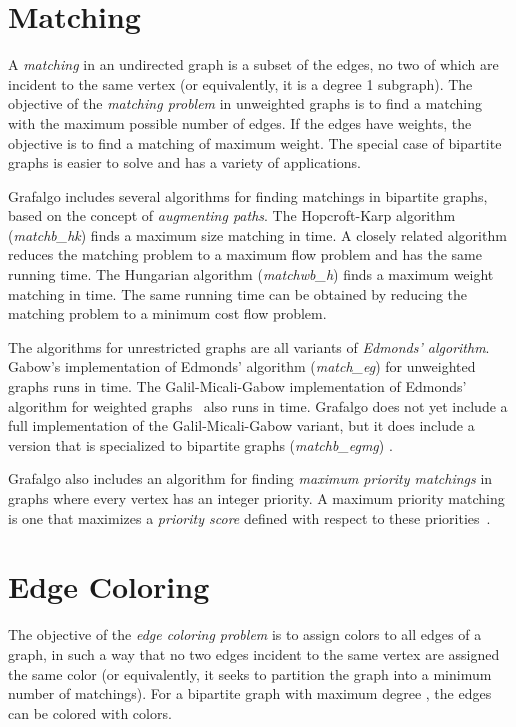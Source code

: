 \documentclass[11pt]{article}
\begin{document}
\section{Matching}

A {\sl matching} in an undirected graph is a subset of the edges,
no two of which are incident to the same vertex (or equivalently, it is a degree 1 subgraph).
The objective of the {\sl matching problem} in unweighted graphs is to find a matching
with the maximum possible number of edges.
If the edges have weights, the objective is to find a matching of maximum weight.
The special case of bipartite graphs is easier to solve and has a variety of applications.

Grafalgo includes several algorithms for finding matchings in bipartite graphs,
based on the concept of {\sl augmenting paths}.
The Hopcroft-Karp algorithm ({\sl matchb\_hk}) finds a maximum size matching in  time.
A closely related algorithm reduces the matching problem to a maximum flow problem and
has the same running time.
The Hungarian algorithm ({\sl matchwb\_h}) finds a maximum weight matching in  time.
The same running time can be obtained by reducing the matching problem to a minimum cost flow problem.

The algorithms for unrestricted graphs are all variants of {\sl Edmonds' algorithm}.
Gabow's implementation of Edmonds' algorithm ({\sl match\_eg}) for unweighted graphs runs in  time.
The Galil-Micali-Gabow implementation of Edmonds' algorithm for weighted
graphs~\cite{GMG86} also runs in  time.
Grafalgo does not yet include a full implementation of the Galil-Micali-Gabow variant,
but it does include a version that is specialized to bipartite graphs ({\sl matchb\_egmg}) .

Grafalgo also includes an algorithm for finding {\sl maximum priority matchings} in graphs where every vertex
has an integer priority. A maximum priority matching is one that maximizes a {\sl priority score}
defined with respect to these priorities~\cite{turner-2015b, turner-2015d}.

\section{Edge Coloring}

The objective of the {\sl edge coloring problem} is to assign colors to all edges of a graph,
in such a way that no two edges incident to the same vertex are assigned the same color
(or equivalently, it seeks to partition the graph into a minimum number of matchings).
For a bipartite graph with maximum degree , the edges can be colored with  colors.
\end{document}
